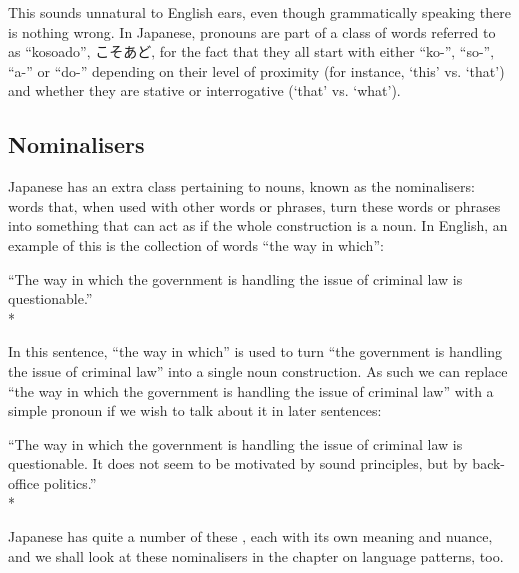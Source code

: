 \documentclass[11pt, b5paper, twoside, openright, onecolumn]{book}
\newenvironment{exampleblock}{
\setlength{\parindent}{0.6in}
\begin{minipage}[t]{\dimexpr\textwidth-\parindent}}
{\end{minipage}}
\begin{document}
This sounds unnatural to English ears‚ even though grammatically speaking there is nothing wrong. In Japanese‚ pronouns are part of a class of words  referred to as “kosoado”‚ こそあど‚ for the fact that they all start with either “ko-”‚ “so-”‚ “a-” or “do-” depending on their level of proximity (for instance‚ ‘this’ vs. ‘that’) and whether they are stative or interrogative (‘that’ vs. ‘what’).

\subsection{Nominalisers}

Japanese has an extra class pertaining to nouns‚ known as the nominalisers: words that‚ when used with other words or phrases‚ turn these words or phrases into something that can act as if the whole construction is a noun. In English‚ an example of this is the collection of words “the way in which”:

\vspace{0.4cm}
\begin{exampleblock}
“The way in which the government is handling the issue of criminal law is questionable.” \\* 
\end{exampleblock}
\vspace{0.2cm}

In this sentence‚ “the way in which” is used to turn “the government is handling the issue of criminal law” into a single noun construction. As such we can replace “the way in which the government is handling the issue of criminal law” with a simple pronoun if we wish to talk about it in later sentences:

\vspace{0.4cm}
\begin{exampleblock}
“The way in which the government is handling the issue of criminal law is questionable. It does not seem to be motivated by sound principles‚ but by back-office politics.” \\* 
\end{exampleblock}
\vspace{0.2cm}

Japanese has quite a number of these ‚ each with its own meaning and nuance‚ and we shall look at these nominalisers in the chapter on language patterns‚ too.
\end{document}
